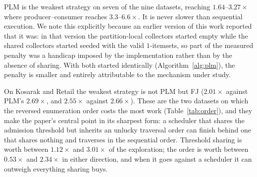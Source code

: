 \documentclass[pdflatex,sn-vancouver-num]{sn-jnl}
\theoremstyle{thmstyleone}%
\theoremstyle{thmstyletwo}%
\theoremstyle{thmstylethree}%
\begin{document}
PLM is the weakest strategy on seven of the nine datasets, reaching
$1.64$--$3.27\times$ where producer--consumer reaches
$3.3$--$6.6\times$. It is never slower than sequential execution. We
note this explicitly because an earlier version of this work reported
that it was: in that version the partition-local collectors started
empty while the shared collectors started seeded with the valid
$1$-itemsets, so part of the measured penalty was a handicap imposed by
the implementation rather than by the absence of sharing. With both
started identically (Algorithm~\ref{alg:plm}), the penalty is smaller
and entirely attributable to the mechanism under study.
 
On Kosarak and Retail the weakest strategy is not PLM but FJ
($2.01\times$ against PLM's $2.69\times$, and $2.55\times$ against
$2.66\times$). These are the two datasets on which the reversed
enumeration order costs the most work (Table~\ref{tab:order}), and they
make the paper's central point in its sharpest form: a scheduler that
shares the admission threshold but inherits an unlucky traversal order
can finish behind one that shares nothing and traverses in the
sequential order. Threshold sharing is worth between $1.12\times$ and
$3.01\times$ of the exploration; the order is worth between
$0.53\times$ and $2.34\times$ in either direction, and when it goes
against a scheduler it can outweigh everything sharing buys.
 
\end{document}
